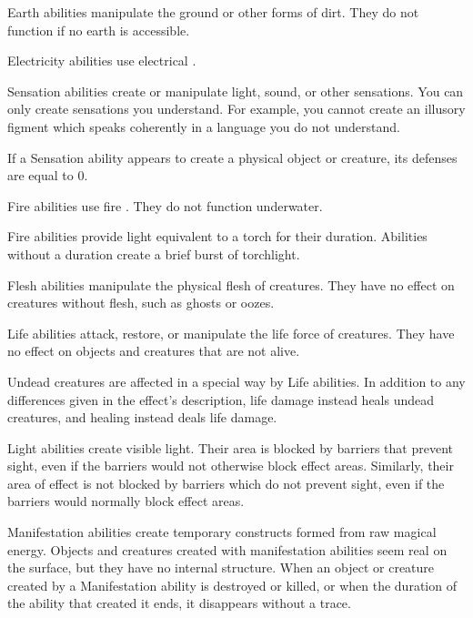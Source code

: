          Earth abilities manipulate the ground or other forms of dirt.
        They do not function if no earth is accessible.

         Electricity abilities use electrical .

         Sensation abilities create or manipulate light, sound, or other sensations.
        You can only create sensations you understand.
        For example, you cannot create an illusory figment which speaks coherently in a language you do not understand.
        \par If a Sensation ability appears to create a physical object or creature, its defenses are equal to 0.

         Fire abilities use fire . They do not function underwater.
        \par Fire abilities provide light equivalent to a torch for their duration.
        Abilities without a duration create a brief burst of torchlight.

         Flesh abilities manipulate the physical flesh of creatures.
        They have no effect on creatures without flesh, such as ghosts or oozes.

         Life abilities attack, restore, or manipulate the life force of creatures.
        They have no effect on objects and creatures that are not alive.
        \par Undead creatures are affected in a special way by Life abilities.
        In addition to any differences given in the effect's description, life damage instead heals undead creatures, and healing instead deals life damage.

         Light abilities create visible light.
        Their area is blocked by barriers that prevent sight, even if the barriers would not otherwise block effect areas.
        Similarly, their area of effect is not blocked by barriers which do not prevent sight, even if the barriers would normally block effect areas.

         Manifestation abilities create temporary constructs formed from raw magical energy.
        Objects and creatures created with manifestation abilities seem real on the surface, but they have no internal structure.
        When an object or creature created by a Manifestation ability is destroyed or killed, or when the duration of the ability that created it ends, it disappears without a trace.

